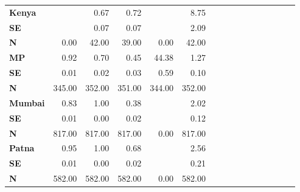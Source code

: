 \begin{tabular}{@{\extracolsep{5pt}}lrrrrrrrrrrrrrrr}
{\bf Kenya} & \phantom{***} & 0.67\phantom{***} & 0.72\phantom{***} & \phantom{***} & 8.75\phantom{***} \\
{\bf SE} & \phantom{***} & 0.07\phantom{***} & 0.07\phantom{***} & \phantom{***} & 2.09\phantom{***} \\
{\bf N} & 0.00\phantom{***} & 42.00\phantom{***} & 39.00\phantom{***} & 0.00\phantom{***} & 42.00\phantom{***} \\
{\bf MP} & 0.92\phantom{***} & 0.70\phantom{***} & 0.45\phantom{***} & 44.38\phantom{***} & 1.27\phantom{***} \\
{\bf SE} & 0.01\phantom{***} & 0.02\phantom{***} & 0.03\phantom{***} & 0.59\phantom{***} & 0.10\phantom{***} \\
{\bf N} & 345.00\phantom{***} & 352.00\phantom{***} & 351.00\phantom{***} & 344.00\phantom{***} & 352.00\phantom{***} \\
{\bf Mumbai} & 0.83\phantom{***} & 1.00\phantom{***} & 0.38\phantom{***} & \phantom{***} & 2.02\phantom{***} \\
{\bf SE} & 0.01\phantom{***} & 0.00\phantom{***} & 0.02\phantom{***} & \phantom{***} & 0.12\phantom{***} \\
{\bf N} & 817.00\phantom{***} & 817.00\phantom{***} & 817.00\phantom{***} & 0.00\phantom{***} & 817.00\phantom{***} \\
{\bf Patna} & 0.95\phantom{***} & 1.00\phantom{***} & 0.68\phantom{***} & \phantom{***} & 2.56\phantom{***} \\
{\bf SE} & 0.01\phantom{***} & 0.00\phantom{***} & 0.02\phantom{***} & \phantom{***} & 0.21\phantom{***} \\
{\bf N} & 582.00\phantom{***} & 582.00\phantom{***} & 582.00\phantom{***} & 0.00\phantom{***} & 582.00\phantom{***} \\
\hline
\end{tabular}
